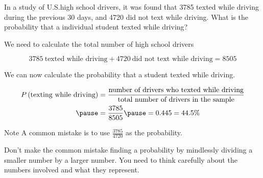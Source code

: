 \documentclass{beamer}
\newcommand{\prob}[1]{P\left(#1\right)}
\begin{document}
\begin{frame}
\begin{example}
In a study of U.S.\@ high school drivers, it was found that 3785 texted while driving during the previous 30 days, and 4720 did not text while driving. What is the probability that a individual student texted while driving?\pause

\vspace{1mm}
We need to calculate the total number of high school drivers

\vspace{-7mm}
\begin{equation*}
3785~\text{texted while driving} + 4720~\text{did not text while driving} = 8505
\end{equation*}\pause

\vspace{-7mm}
We can now calculate the probability that a student texted while driving.

\vspace{-7mm}
\begin{equation*}
\begin{aligned}
\prob{\text{texting while driving}}
&= \dfrac{\text{number of drivers who texted while driving}}{\text{total number of drivers in the sample}} \\\pause
&= \dfrac{3785}{8505}\pause
=0.445 = 44.5\%
\end{aligned}
\end{equation*}
\end{example}\pause

\begin{block}{Note}
A common mistake is to use $\tfrac{3785}{4720}$ as the probability.\pause

\vspace{1mm}
Don't make the common mistake finding a probability by mindlessly dividing a smaller number by a larger number. You need to think carefully about the numbers involved and what they represent.
\end{block}
\end{frame}
\end{document}
